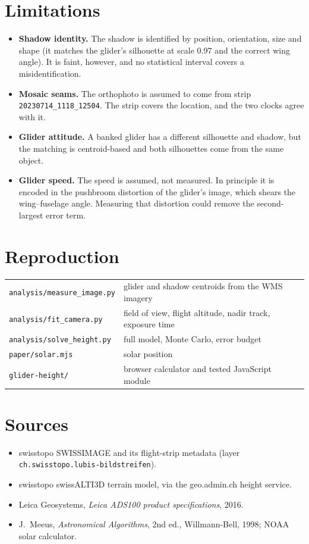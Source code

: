 \documentclass[11pt,a4paper]{article}
\newcommand{\code}[1]{\texttt{#1}}
\begin{document}
\section{Limitations}
\begin{itemize}
  \item \textbf{Shadow identity.} The shadow is identified by position, orientation, size and shape (it matches
        the glider's silhouette at scale 0.97 and the correct wing angle). It is faint, however, and no
        statistical interval covers a misidentification.
  \item \textbf{Mosaic seams.} The orthophoto is assumed to come from strip \code{20230714\_1118\_12504}.
        The strip covers the location, and the two clocks agree with it.
  \item \textbf{Glider attitude.} A banked glider has a different silhouette and shadow, but the matching is
        centroid-based and both silhouettes come from the same object.
  \item \textbf{Glider speed.} The speed is assumed, not measured. In principle it is encoded in the pushbroom
        distortion of the glider's image, which shears the wing--fuselage angle. Measuring that distortion
        could remove the second-largest error term.
\end{itemize}

\section*{Reproduction}
\begin{tabular}{@{}ll@{}}
\code{analysis/measure\_image.py} & glider and shadow centroids from the WMS imagery \\
\code{analysis/fit\_camera.py} & field of view, flight altitude, nadir track, exposure time \\
\code{analysis/solve\_height.py} & full model, Monte Carlo, error budget \\
\code{paper/solar.mjs} & solar position \\
\code{glider-height/} & browser calculator and tested JavaScript module \\
\end{tabular}

\section*{Sources}
{\raggedright
\begin{itemize}
  \item swisstopo SWISSIMAGE and its flight-strip metadata (layer \nolinkurl{ch.swisstopo.lubis-bildstreifen}).
  \item swisstopo swissALTI3D terrain model, via the geo.admin.ch height service.
  \item Leica Geosystems, \emph{Leica ADS100 product specifications}, 2016.
  \item J.~Meeus, \emph{Astronomical Algorithms}, 2nd ed., Willmann-Bell, 1998; NOAA solar calculator.
\end{itemize}
}
\end{document}
